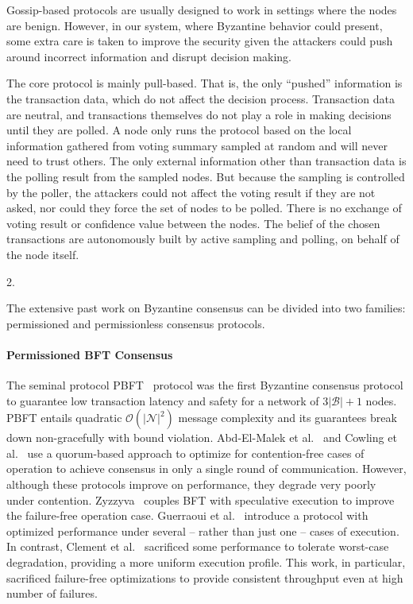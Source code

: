 Gossip-based protocols are usually designed to work in settings where the nodes
are benign. However, in our system, where Byzantine behavior could present,
some extra care is taken to improve the security given the attackers could push
around incorrect information and disrupt decision making.

The core protocol is mainly pull-based. That is, the only ``pushed''
information is the transaction data, which do not affect the decision process.
Transaction data are neutral, and transactions themselves do not play a role in
making decisions until they are polled. A node only runs the protocol based on
the local information gathered from voting summary sampled at random and will
never need to trust others. The only external information other than
transaction data is the polling result from the sampled nodes. But because the
sampling is controlled by the poller, the attackers could not affect the voting
result if they are not asked, nor could they force the set of nodes to be
polled. There is no exchange of voting result or confidence value between the
nodes. The belief of the chosen transactions are autonomously built by active
sampling and polling, on behalf of the node itself.

2.


The extensive past work on Byzantine consensus can be divided into two families: permissioned and permissionless consensus protocols. 

\paragraph{Permissioned BFT Consensus}
The seminal protocol PBFT~\cite{castro1999practical} protocol was the first Byzantine consensus protocol to guarantee low transaction latency and safety for a network of $3|\mathcal{B}|+1$ nodes.  
PBFT entails quadratic $\mathcal{O}(|\mathcal{N}|^2)$ message complexity and its guarantees break down non-gracefully with bound violation. 
Abd-El-Malek et al.~\cite{abd2005fault} and Cowling et al.~\cite{cowling2006hq} use a quorum-based approach to optimize for contention-free cases of operation to achieve consensus in only a single round of communication. 
However, although these protocols improve on performance, they degrade very poorly under contention. 
Zyzzyva~\cite{kotla2007zyzzyva} couples BFT with speculative execution to improve the failure-free operation case. 
Guerraoui et al.~\cite{guerraoui2010next} introduce a protocol with optimized performance under several -- rather than just one -- cases of execution. 
In contrast, Clement et al.~\cite{clement2009making} sacrificed some performance to tolerate worst-case degradation, providing a more uniform execution profile. 
This work, in particular, sacrificed failure-free optimizations to provide consistent throughput even at high number of failures. 

